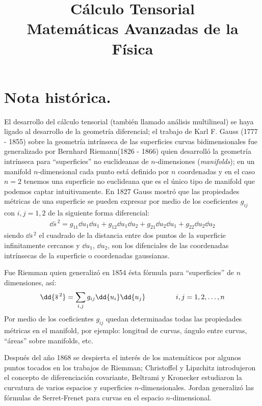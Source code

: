  
\author{}
\title{Cálculo Tensorial\\ {\large Matemáticas Avanzadas de la Física}\vspace{-1.5\baselineskip}}
\date{ }

\maketitle
\fontsize{14}{14}\selectfont
\section{Nota histórica.}
El desarrollo del cálculo tensorial (también llamado análisis multilineal) se haya ligado al desarrollo de la geometría diferencial; el trabajo de Karl F. Gauss (1777 - 1855) sobre la geometría intrínseca de las superficies curvas bidimensionales fue generalizado por Bernhard Riemann(1826 - 1866) quien desarrolló la geometría intrínseca para \enquote{superficies} no euclideanas de $n$-dimensiones (\emph{manifolds}); en un manifold $n$-dimensional cada punto está definido por $n$ coordenadas y en el caso $n = 2$ tenemos una superficie no euclideana que es el único tipo de manifold que podemos captar intuitivamente. En 1827 Gauss mostró que las propiedades métricas de una superficie se pueden expresar por medio de los coeficientes $g_{ij}$ con $i, j =1, 2$ de la siguiente forma diferencial:
\begin{align*}
\dd{\overline{s}^{\, 2}} = g_{11} \dd{u_{1}} \dd{u_{1}} + g_{12} \dd{u_{1}} \dd{u_{2}} + g_{21} \dd{u_{2}} \dd{u_{1}} + g_{22} \dd{u_{2}} \dd{u_{2}}
\end{align*}
siendo $\dd{\overline{s}^{\, 2}}$ el cuadrado de la distancia entre dos puntos de la superficie infinitamente cercanos y $\dd{u_{1}}$, $\dd{u_{2}}$, son los difenciales de las coordenadas intrínsecas de la superficie o coordenadas gaussianas.
\par
Fue Riemman quien generalizó en 1854 ésta fórmula para \enquote{superficies} de $n$ dimensiones, así:
\begin{align*}
\dd{\overline{s}^{\, 2}} = \sum_{i, j} g_{ij} \dd{u_{i}} \dd{u_{j}} \hspace{1.5cm} i, j = 1, 2, \ldots, n
\end{align*}
Por medio de los coeficientes $g_{ij}$ quedan determinadas todas las propiedades métricas en el manifold, por ejemplo: longitud de curvas, ángulo entre curvas, \enquote{áreas} sobre manifolds, etc.
\par
Después del año 1868 se despierta el interés de los matemáticos por algunos puntos tocados en los trabajos de Riemman; Christoffel y Lipzchitz introdujeron el concepto de diferenciación covariante, Beltrami y Kronecker estudiaron la curvatura de varios espacios y superficies $n$-dimensionales. Jordan generalizó las fórmulas de Serret-Frenet para curvas en el espacio $n$-dimensional.
